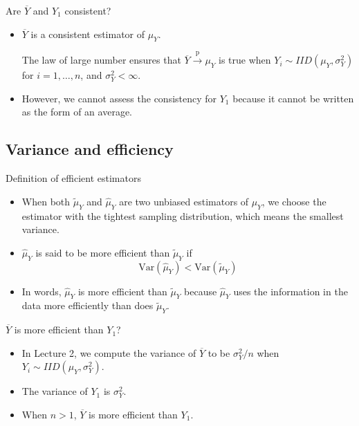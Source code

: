 \documentclass[presentation]{beamer}
\begin{document}
\begin{frame}[label={sec:orgbb4e617}]{Are \(\overline{Y}\) and \(Y_1\) consistent?}
\begin{itemize}
\item \(\overline{Y}\) is a consistent estimator of \(\mu_Y\). 

\vspace{0.3cm}

The law of large number ensures that \(\overline{Y}
  \xrightarrow{\text{ p }} \mu_Y\) is true when \(Y_i \sim IID(\mu_Y,
  \sigma^2_Y)\) for \(i=1, \ldots, n\), and \(\sigma^2_Y < \infty\).

\vspace{0.3cm}

\item However, we cannot assess the consistency for \(Y_1\) because it cannot
be written as the form of an average.
\end{itemize}
\end{frame}

\subsection*{Variance and efficiency}
\label{sec:orgad5767a}

\begin{frame}[label={sec:org040d5e9}]{Definition of efficient estimators}
\begin{itemize}
\item When both \(\tilde{\mu}_Y\) and \(\hat{\mu}_Y\) are two unbiased
estimators of \(\mu_Y\), we choose the estimator with the tightest
sampling distribution, which means the smallest variance.

\item \(\hat{\mu}_Y\) is said to be more efficient than \(\tilde{\mu}_Y\) if
\[\mathrm{Var}(\hat{\mu}_Y) < \mathrm{Var}(\tilde{\mu}_Y)\]

\item In words, \(\hat{\mu}_Y\) is more efficient than \(\tilde{\mu}_Y\)
because \(\hat{\mu}_Y\) uses the information in the data more
efficiently than does \(\tilde{\mu}_Y\).
\end{itemize}
\end{frame}

\begin{frame}[label={sec:org7c03ab8}]{\(\overline{Y}\) is more efficient than \(Y_1\)?}
\begin{itemize}
\item In Lecture 2, we compute the variance of \(\overline{Y}\) to be
\(\sigma^2_Y / n\) when \(Y_i \sim IID(\mu_Y, \sigma^2_Y)\).

\item The variance of \(Y_1\) is \(\sigma^2_Y\).

\item When \(n > 1\), \(\overline{Y}\) is more
efficient than \(Y_1\).
\end{itemize}
\end{frame}
\end{document}
